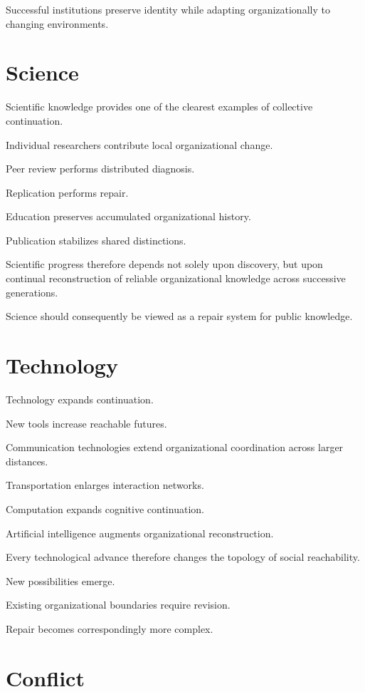 \documentclass[11pt,oneside]{book}
\numberwithin{equation}{chapter}
\theoremstyle{definition}
\theoremstyle{plain}
\begin{document}
Successful institutions preserve identity while adapting organizationally
to changing environments.

\section{Science}

Scientific knowledge provides one of the clearest examples of collective
continuation.

Individual researchers contribute local organizational change.

Peer review performs distributed diagnosis.

Replication performs repair.

Education preserves accumulated organizational history.

Publication stabilizes shared distinctions.

Scientific progress therefore depends not solely upon discovery, but upon
continual reconstruction of reliable organizational knowledge across
successive generations.

Science should consequently be viewed as a repair system for public
knowledge.

\section{Technology}

Technology expands continuation.

New tools increase reachable futures.

Communication technologies extend organizational coordination across
larger distances.

Transportation enlarges interaction networks.

Computation expands cognitive continuation.

Artificial intelligence augments organizational reconstruction.

Every technological advance therefore changes the topology of social
reachability.

New possibilities emerge.

Existing organizational boundaries require revision.

Repair becomes correspondingly more complex.

\section{Conflict}
\end{document}
